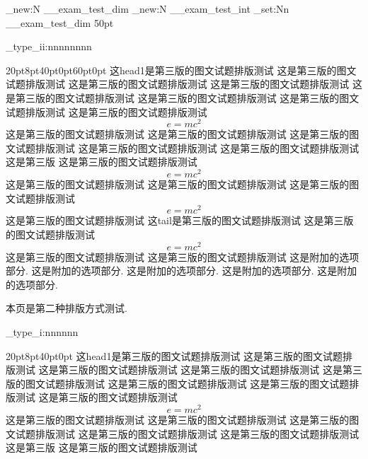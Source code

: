 \documentclass[a4paper,fontset = windowsnew]{ctexbook}
\begin{document}

      \dim_new:N \g__exam_test_dim
      \int_new:N \g__exam_test_int
      \dim_set:Nn \g__exam_test_dim {50pt}

      \cexam_type_ii:nnnnnnnn 
      {
      }
    {20pt}{8pt}{40pt}{0pt}{60pt}{0pt}
    {
	这head1是第三版的图文试题排版测试
	这是第三版的图文试题排版测试
	这是第三版的图文试题排版测试
	这是第三版的图文试题排版测试
	这是第三版的图文试题排版测试
	这是第三版的图文试题排版测试
	这是第三版的图文试题排版测试
	这是第三版的图文试题排版测试
	\begin{equation}
	  e=mc^2
	\end{equation}
	这是第三版的图文试题排版测试
	这是第三版的图文试题排版测试
	这是第三版的图文试题排版测试
	这是第三版的图文试题排版测试
	这是第三版的图文试题排版测试
	这是第三版
	这是第三版的图文试题排版测试
	\begin{equation}
	  e=mc^2
	\end{equation}
	这是第三版的图文试题排版测试
	这是第三版的图文试题排版测试
	这是第三版的图文试题排版测试
	\begin{equation}
	  e=mc^2
	\end{equation}
	这是第三版的图文试题排版测试
	这tail是第三版的图文试题排版测试
	这是第三版的图文试题排版测试
	\begin{equation}
	  e=mc^2
	\end{equation}
	这是第三版的图文试题排版测试
	这是第三版的图文试题排版测试
      }
      \newline
      这是附加的选项部分.
      这是附加的选项部分.
      这是附加的选项部分.
      这是附加的选项部分.
      这是附加的选项部分.

    \newpage
    本页是第二种排版方式测试. 

    \par

    \cexam_type_i:nnnnnn 
      {
      }
      {20pt}{8pt}{40pt}{0pt}
      {
	这head1是第三版的图文试题排版测试
	这是第三版的图文试题排版测试
	这是第三版的图文试题排版测试
	这是第三版的图文试题排版测试
	这是第三版的图文试题排版测试
	这是第三版的图文试题排版测试
	这是第三版的图文试题排版测试
	这是第三版的图文试题排版测试
	\begin{equation}
	  e=mc^2
	\end{equation}
	这是第三版的图文试题排版测试
	这是第三版的图文试题排版测试
	这是第三版的图文试题排版测试
	这是第三版的图文试题排版测试
	这是第三版的图文试题排版测试
	这是第三版
	这是第三版的图文试题排版测试
      }


    
\end{document}
